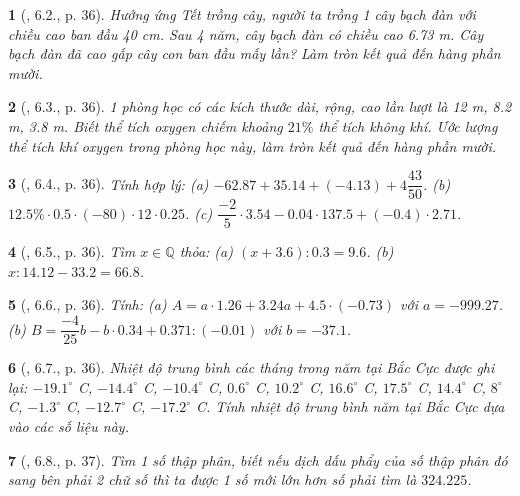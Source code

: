 \documentclass{article}
\newtheorem{baitoan}{}
\begin{document}
\begin{baitoan}[\cite{Binh_boi_duong_Toan_6_tap_2}, 6.2., p. 36]
	Hưởng ứng Tết trồng cây, người ta trồng 1 cây bạch đàn với chiều cao ban đầu {\rm40 cm}. Sau 4 năm, cây bạch đàn có chiều cao {\rm6.73 m}. Cây bạch đàn đã cao gấp cây con ban đầu mấy lần? Làm tròn kết quả đến hàng phần mười.
\end{baitoan}

\begin{baitoan}[\cite{Binh_boi_duong_Toan_6_tap_2}, 6.3., p. 36]
	1 phòng học có các kích thước dài, rộng, cao lần lượt là {\rm12 m, 8.2 m, 3.8 m}. Biết thể tích oxygen chiếm khoảng $21\%$ thể tích không khí. Ước lượng thể tích khí oxygen trong phòng học này, làm tròn kết quả đến hàng phần mười.
\end{baitoan}

\begin{baitoan}[\cite{Binh_boi_duong_Toan_6_tap_2}, 6.4., p. 36]
	Tính hợp lý: (a) $-62.87 + 35.14 + (-4.13) + 4\dfrac{43}{50}$. (b) $12.5\%\cdot0.5\cdot(-80)\cdot12\cdot0.25$. (c) $\dfrac{-2}{5}\cdot3.54 - 0.04\cdot137.5 + (-0.4)\cdot2.71$.
\end{baitoan}

\begin{baitoan}[\cite{Binh_boi_duong_Toan_6_tap_2}, 6.5., p. 36]
	Tìm $x\in\mathbb{Q}$ thỏa: (a) $(x + 3.6):0.3 = 9.6$. (b) $x:14.12 - 33.2 = 66.8$.
\end{baitoan}

\begin{baitoan}[\cite{Binh_boi_duong_Toan_6_tap_2}, 6.6., p. 36]
	Tính: (a) $A = a\cdot1.26 + 3.24a + 4.5\cdot(-0.73)$ với $a = -999.27$. (b) $B = \dfrac{-4}{25}b - b\cdot0.34 + 0.371:(-0.01)$ với $b = -37.1$.
\end{baitoan}

\begin{baitoan}[\cite{Binh_boi_duong_Toan_6_tap_2}, 6.7., p. 36]
	Nhiệt độ trung bình các tháng trong năm tại Bắc Cực được ghi lại: {\rm$-19.1^\circ$ C, $-14.4^\circ$ C, $-10.4^\circ$ C, $0.6^\circ$ C, $10.2^\circ$ C, $16.6^\circ$ C, $17.5^\circ$ C, $14.4^\circ$ C, $8^\circ$ C, $-1.3^\circ$ C, $-12.7^\circ$ C, $-17.2^\circ$ C}. Tính nhiệt độ trung bình năm tại Bắc Cực dựa vào các số liệu này.
\end{baitoan}

\begin{baitoan}[\cite{Binh_boi_duong_Toan_6_tap_2}, 6.8., p. 37]
	Tìm 1 số thập phân, biết nếu dịch dấu phẩy của số thập phân đó sang bên phải 2 chữ số thì ta được 1 số mới lớn hơn số phải tìm là $324.225$.
\end{baitoan}
\end{document}
